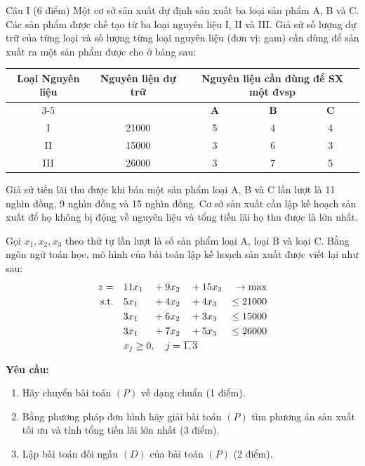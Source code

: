 \begin{questionblock}{Câu I (6 điểm)}
Một cơ sở sản xuất dự định sản xuất ba loại sản phẩm A, B và C. Các sản phẩm được chế tạo từ ba loại nguyên liệu I, II và III. Giả sử số lượng dự trữ của từng loại và số lượng từng loại nguyên liệu (đơn vị: gam) cần dùng để sản xuất ra một sản phẩm được cho ở bảng sau:

\begin{table}[htbp]
    \centering
    \renewcommand{\arraystretch}{1.3}
    \begin{tabular}{|c|c|c|c|c|}
        \hline
        \multirow{2}{*}{\textbf{Loại Nguyên liệu}} & \multirow{2}{*}{\textbf{Nguyên liệu dự trữ}} & \multicolumn{3}{c|}{\textbf{Nguyên liệu cần dùng để SX một đvsp}} \\
        \cline{3-5}
        & & \textbf{A} & \textbf{B} & \textbf{C} \\
        \hline
        I & 21000 & 5 & 4 & 4 \\
        \hline
        II & 15000 & 3 & 6 & 3 \\
        \hline
        III & 26000 & 3 & 7 & 5 \\
        \hline
    \end{tabular}
\end{table}

Giả sử tiền lãi thu được khi bán một sản phẩm loại A, B và C lần lượt là 11 nghìn đồng, 9 nghìn đồng và 15 nghìn đồng. Cơ sở sản xuất cần lập kế hoạch sản xuất để họ không bị động về nguyên liệu và tổng tiền lãi họ thu được là lớn nhất.

Gọi $x_1, x_2, x_3$ theo thứ tự lần lượt là số sản phẩm loại A, loại B và loại C. Bằng ngôn ngữ toán học, mô hình của bài toán lập kế hoạch sản xuất được viết lại như sau:
\begin{alignat*}{4}
    z = \quad & 11x_1 & {}+{} & 9x_2 & {}+{} & 15x_3 & \rightarrow \max \\
    \text{s.t.} \quad & 5x_1 & {}+{} & 4x_2 & {}+{} & 4x_3 & \le 21000 \\
    & 3x_1 & {}+{} & 6x_2 & {}+{} & 3x_3 & \le 15000 \\
    & 3x_1 & {}+{} & 7x_2 & {}+{} & 5x_3 & \le 26000 \\
    & \rlap{$x_j \ge 0, \quad j = \overline{1,3}$}
\end{alignat*}

\textbf{Yêu cầu:}
\begin{enumerate}
    \item Hãy chuyển bài toán $(P)$ về dạng chuẩn (1 điểm).
    \item Bằng phương pháp đơn hình hãy giải bài toán $(P)$ tìm phương án sản xuất tối ưu và tính tổng tiền lãi lớn nhất (3 điểm).
    \item Lập bài toán đối ngẫu $(D)$ của bài toán $(P)$ (2 điểm).
\end{enumerate}
\end{questionblock}

